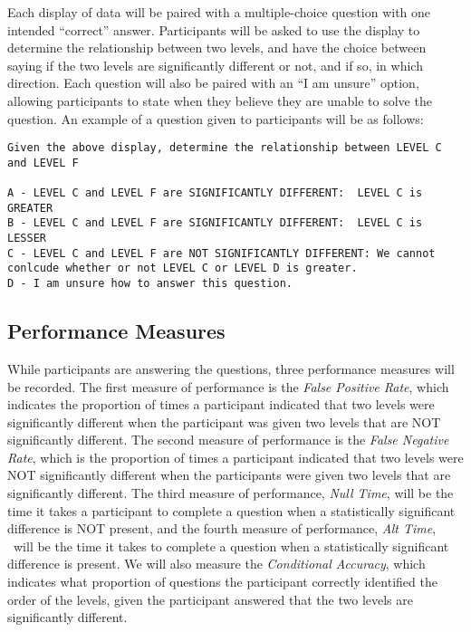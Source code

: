 \documentclass{article}
\begin{document}
Each display of data will be paired with a multiple-choice question with one intended ``correct'' answer. Participants will be asked to use the display to determine the relationship between two levels, and have the choice between saying if the two levels are significantly different or not, and if so, in which direction. Each question will also be paired with an ``I am unsure'' option, allowing participants to state when they believe they are unable to solve the question. An example of a question given to participants will be as follows:

\begin{lstlisting}
Given the above display, determine the relationship between LEVEL C and LEVEL F 

A - LEVEL C and LEVEL F are SIGNIFICANTLY DIFFERENT:  LEVEL C is GREATER
B - LEVEL C and LEVEL F are SIGNIFICANTLY DIFFERENT:  LEVEL C is LESSER
C - LEVEL C and LEVEL F are NOT SIGNIFICANTLY DIFFERENT: We cannot conlcude whether or not LEVEL C or LEVEL D is greater.
D - I am unsure how to answer this question. 
\end{lstlisting}

\subsection{Performance Measures}

While participants are answering the questions, three performance measures will be recorded. The first measure of performance is the \emph{False Positive Rate}, which indicates the proportion of times a participant indicated that two levels were significantly different when the participant was given two levels that are NOT significantly different. The second measure of performance is the \emph{False Negative Rate}, which is the proportion of times a participant indicated that two levels were NOT significantly different when the participants were given two levels that are significantly different. The third measure of performance, \emph{Null Time}, will be the time it takes a participant to complete a question when a statistically significant difference is NOT present, and the fourth measure of performance, \emph{Alt Time},  will be the time it takes to complete a question when a statistically significant difference is present. We will also measure the \emph{Conditional Accuracy}, which indicates what proportion of questions the participant correctly identified the order of the levels, given the participant answered that the two levels are significantly different.
\end{document}
